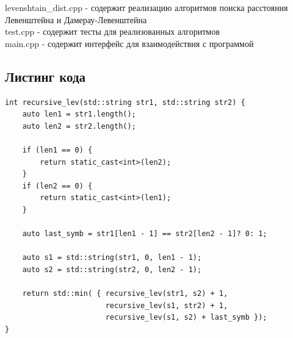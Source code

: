 \documentclass[a4paper,12pt]{article}
\begin{document}
    	\noindent levenshtain\_dist.cpp - содержит реализацию алгоритмов поиска расстояния Левенштейна и Дамерау-Левенштейна\\
    	test.cpp - содержит тесты для реализованных алгоритмов\\
	    main.cpp - содержит интерфейс для взаимодействия с программой\\
		\newpage
    \begin{center}
        \subsection{Листинг кода}    
    \end{center}
        	
        		\begin{lstlisting}[frame=single,caption=Рекурсивный алгоритм вычисления расстояния Левенштейна, breaklines]
int recursive_lev(std::string str1, std::string str2) {
    auto len1 = str1.length();
    auto len2 = str2.length();

    if (len1 == 0) {
        return static_cast<int>(len2);
    }
    if (len2 == 0) {
        return static_cast<int>(len1);
    }

    auto last_symb = str1[len1 - 1] == str2[len2 - 1]? 0: 1;

    auto s1 = std::string(str1, 0, len1 - 1);
    auto s2 = std::string(str2, 0, len2 - 1);

    return std::min( { recursive_lev(str1, s2) + 1,
                       recursive_lev(s1, str2) + 1,
                       recursive_lev(s1, s2) + last_symb });
}
        		\end{lstlisting}        		
    
\end{document}
